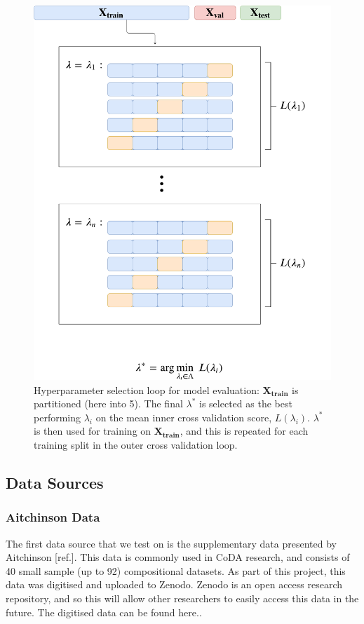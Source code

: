 \begin{figure}
    \centering
    \includegraphics[width = \columnwidth]{figs/cross_val(1)(1).pdf}
    \caption{Hyperparameter selection loop for model evaluation: $\mathbf{X_{train}}$ is partitioned (here into 5). The final $\lambda^*$ is selected as the best performing $\lambda_i$ on the mean inner cross validation score, $L(\lambda_i)$. $\lambda^*$ is then used for training on $\mathbf{X_{train}}$, and this is repeated for each training split in the outer cross validation loop. }
    \label{fig:cross_val}
\end{figure}

\subsection{Data Sources}

\subsubsection{Aitchinson Data}
The first data source that we test on is the supplementary data presented by Aitchinson [ref.]. This data is commonly used in CoDA research, and consists of 40 small sample (up to 92) compositional datasets. As part of this project, this data was digitised and uploaded to Zenodo. Zenodo is an open access research repository, and so this will allow other researchers to easily access this data in the future. The digitised data can be found here..  


